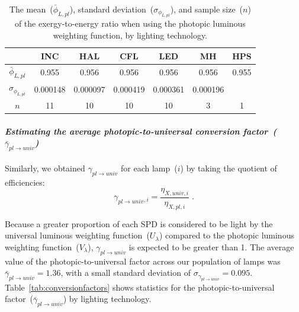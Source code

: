 \documentclass[energies,article,accept,moreauthors,pdftex]{Definitions/mdpi}\usepackage[]{graphicx}\usepackage[]{color}
\newcommand{\gammarat}{\gamma_{pl\rightarrow{}univ}}
\newcommand{\gammaratavg}{\bar{\gamma}_{pl\rightarrow{}univ}}
\providecommand{\DIFaddend}{} %
\providecommand{\DIFaddendFL}{} %
\DeclareRobustCommand{\DIFaddend}{\DIFOaddend \let\includegraphics\DIFOincludegraphics} %
\DeclareRobustCommand{\DIFaddendFL}{\DIFOaddendFL \let\includegraphics\DIFOincludegraphics} %
\begin{document}
\begin{table}[H]
\centering
\caption{The mean~($\bar{\phi}_{L,pl}$),
                     standard deviation~($\sigma_{\phi_{L,pl}}$), and 
                     sample size~($n$)
                     of the exergy-to-energy ratio when using
                     the photopic luminous weighting function,
                     by lighting technology.} 
\label{tab:mean_phi_p2_by_lamp_type}
\begingroup\footnotesize
\begin{tabular}{ccccccc}
  \toprule
 & \textbf{INC} & \textbf{HAL} & \textbf{CFL} & \textbf{LED} & \textbf{MH} & \textbf{HPS} \\ 
  \midrule
\DIFaddendFL $\bar{\phi}_{L,pl}$  & 0.955 & 0.956 &0.956 & 0.956 & 0.956 & 0.955 \\ 
 $\sigma_{\phi_{L,pl}}$ & 0.000148 &0.000097 & 0.000419 & 0.000361 & 0.000196 &  \\ 
 $n$ & 11 & 10 & 10 & 10& 3& 1\\ 
   \bottomrule
\end{tabular}
\endgroup
\end{table}
\DIFaddend 



\paragraph{\emph{Estimating the average photopic-to-universal conversion factor~($\gammaratavg{}$)}}

Similarly, we obtained $\gammarat{}$ for each lamp~($i$) by taking the quotient of efficiencies:
\begin{equation} \label{eq:conversionuniversal}
  \gammarat{}_{,i} = \frac{\eta_{X,univ,i}}{\eta_{X,pl,i}} \; .
\end{equation}

Because a greater proportion of each SPD is considered to be light
by the universal luminous weighting function~($U_\lambda$)
compared to the photopic luminous weighting function~($V_\lambda$), 
$\gammarat{}$ is expected to be greater than 1.
The average value of the photopic-to-universal factor across our population of lamps 
was $\gammaratavg{} = 1.36$,
with a small standard deviation of $\sigma_{\gammarat{}} = 0.095$. Table~\ref{tab:conversionfactors} shows 
statistics for the photopic-to-universal factor~($\gammaratavg{}$)
by lighting technology.
\end{document}
